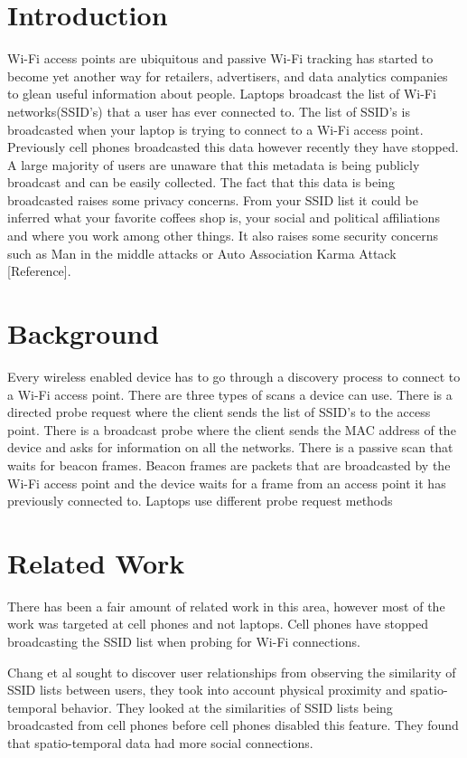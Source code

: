 \documentclass[letterpaper,twocolumn,10pt]{article}
\begin{document}
\section{Introduction}
Wi-Fi access points are ubiquitous and passive Wi-Fi tracking has started to become yet another way for retailers, advertisers, and data analytics companies to glean useful information about people. Laptops broadcast the list of Wi-Fi networks(SSID's) that a user has ever connected to. The list of SSID's is broadcasted when your laptop is trying to connect to a Wi-Fi access point. Previously cell phones broadcasted this data however recently they have stopped. A large majority of users are unaware that this metadata is being publicly broadcast and can be easily collected. The fact that this data is being broadcasted raises some privacy concerns. From your SSID list it could be inferred what your favorite coffees shop is, your social and political affiliations and where you work among other things. It also raises some security concerns such as Man in the middle attacks or Auto Association Karma Attack [Reference]. 

\section{Background}

Every wireless enabled device has to go through a discovery process to connect to a Wi-Fi access point. There are three types of scans a device can use. There is a directed probe request where the client sends the list of SSID's to the access point. There is a broadcast probe where the client sends the MAC address of the device and asks for information on all the networks. There is a passive scan that waits for beacon frames. Beacon frames are packets that are broadcasted by the Wi-Fi access point and the device waits for a frame from an access point it has previously connected to. Laptops use different probe request methods 

\section{Related Work}
There has been a fair amount of related work in this area, however most of the work was targeted at cell phones and not laptops. Cell phones have stopped broadcasting the SSID list when probing for Wi-Fi connections.

Chang et al  sought to discover user relationships from observing the similarity of SSID lists between users, they took into account physical proximity and spatio-temporal behavior. They looked at the similarities of SSID lists being broadcasted from cell phones before cell phones disabled this feature. They found that spatio-temporal data had more social connections. 
\end{document}
